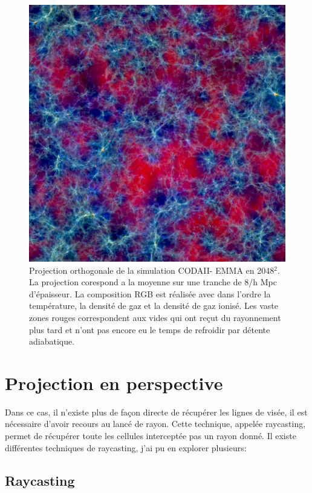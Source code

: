 \begin{figure}[bth]
        \includegraphics[width=.95\textwidth]{img/04/rgb-compose.jpeg} 
        \caption{Projection orthogonale de la simulation CODAII- EMMA en 2048$^2$.
        La projection corespond a la moyenne sur une tranche de 8/h Mpc d'épaisseur. 
        La composition RGB est réalisée avec dans l'ordre la température, la densité de gaz et la densité de gaz ionisé.
		Les vaste zones rouges correspondent aux vides qui ont reçut du rayonnement plus tard et n'ont pas encore eu le temps de refroidir par détente adiabatique.  
        }
 		\label{fig:ortho}
\end{figure}

\section{Projection en perspective}

Dans ce cas, il n'existe plus de façon directe de récupérer les lignes de visée, il est nécessaire d'avoir recours au lancé de rayon.
Cette technique, appelée raycasting, permet de récupérer toute les cellules interceptée pas un rayon donné.
Il existe différentes techniques de raycasting, j'ai pu en explorer plusieurs:

\subsection{Raycasting}
